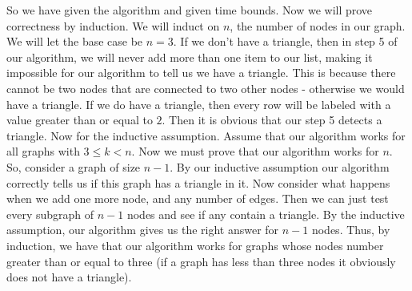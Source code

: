 \documentclass{article}
\begin{document}
\begin{description}
        So we have given the algorithm and given time bounds. Now we will prove
        correctness by induction. We will induct on $n$, the number of nodes in
        our graph. We will let the base case be $n = 3$. If we don't have a
        triangle, then in step 5 of our algorithm, we will never add more than
        one item to our list, making it impossible for our algorithm to tell us
        we have a triangle. This is because there cannot be two nodes that are
        connected to two other nodes - otherwise we would have a triangle. If we
        do have a triangle, then every row will be labeled with a value greater
        than or equal to $2$. Then it is obvious that our step 5 detects a
        triangle. Now for the inductive assumption. Assume that our algorithm
        works for all graphs with $3 \leq k < n$. Now we must prove that our
        algorithm works for $n$. So, consider a graph of size $n-1$. By our
        inductive assumption our algorithm correctly tells us if this graph has
        a triangle in it. Now consider what happens when we add one more node,
        and any number of edges. Then we can just test every subgraph of
        $n-1$ nodes and see if any contain a triangle. By the inductive
        assumption, our algorithm gives us the right answer for $n-1$ nodes.
        Thus, by induction, we have that our algorithm works for graphs whose
        nodes number greater than or equal to three (if a graph has less than
        three nodes it obviously does not have a triangle).
\end{description}
\newpage

\end{document}
